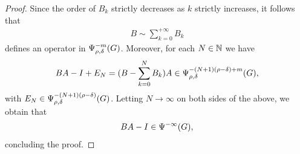 \begin{proof}
    Since the order of $B_k$ strictly decreases as $k$ strictly increases,
    it follows that
    \begin{align*}
        B \sim \sum_{k = 0}^{+\infty} B_k
    \end{align*}
    defines an operator in $\Psi^{-m}_{\rho, \delta}(G)$.
    Moreover,
    for each $N \in \mathbb{N}$ we have
    \begin{align*}
        B A - I + E_{N}
        =
        (B - \sum_{k = 0}^N B_k) A \in \Psi^{-(N + 1) (\rho - \delta)  + m}_{\rho, \delta}(G),
    \end{align*}
    with $E_N \in \Psi^{-(N + 1)(\rho - \delta)}_{\rho, \delta}(G)$.
    Letting $N \to \infty$ on both sides of the above,
    we obtain that
    \begin{align*}
        B A - I \in {\Psi^{-\infty} (G)},
    \end{align*}
    concluding the proof.
\end{proof}
